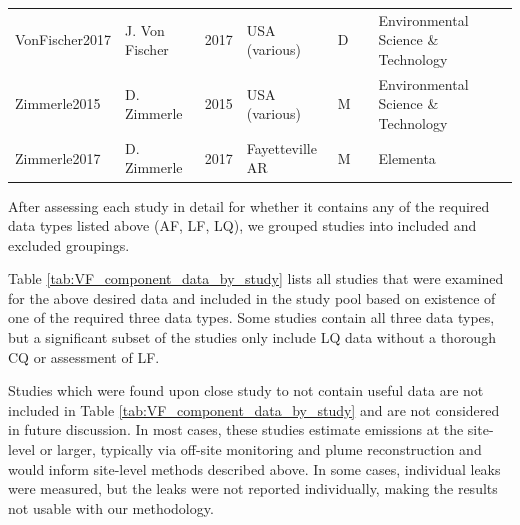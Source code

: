 \documentclass[11pt]{report}
\begin{document}
\begin{landscape}
\begin{table}[]
\begin{scriptsize}
\begin{tabular*}{1\columnwidth}{lllllll}
VonFischer2017    	& J. Von Fischer         	& 2017 	& USA (various)  	& D     	& \cite{VonFischer2017}       & Environmental Science \& Technology   \\
Zimmerle2015      	& D. Zimmerle  	& 2015 	& USA (various)  	& M     	& \cite{Zimmerle2015}   & Environmental Science \& Technology   \\
Zimmerle2017      	& D. Zimmerle  	& 2017 	& Fayetteville AR	& M     	& \cite{Zimmerle2017}    & Elementa      \\   
\bottomrule
\end{tabular*}
\end{scriptsize}
\end{table}
\end{landscape}


After assessing each study in detail for whether it contains any of the required data types listed above (AF, LF, LQ), we grouped studies into included and excluded groupings.  

Table \ref{tab:VF_component_data_by_study} lists all studies that were examined for the above desired data and included in the study pool based on existence of one of the required three data types. Some studies contain all three data types, but a significant subset of the studies only include LQ data without a thorough CQ or assessment of LF.

Studies which were found upon close study to not contain useful data are not included in Table \ref{tab:VF_component_data_by_study} and are not considered in future discussion. In most cases, these studies estimate emissions at the site-level or larger, typically via off-site monitoring and plume reconstruction and would inform site-level methods described above. In some cases, individual leaks were measured, but the leaks were not reported individually, making the results not usable with our methodology.
\end{document}
